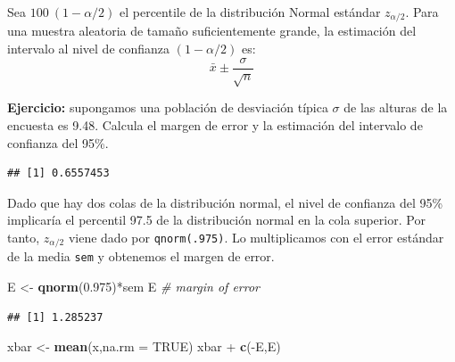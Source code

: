 \documentclass[]{article}
\newenvironment{Shaded}{\begin{snugshade}}{\end{snugshade}}
\newcommand{\KeywordTok}[1]{\textcolor[rgb]{0.13,0.29,0.53}{\textbf{{#1}}}}
\newcommand{\DataTypeTok}[1]{\textcolor[rgb]{0.13,0.29,0.53}{{#1}}}
\newcommand{\FloatTok}[1]{\textcolor[rgb]{0.00,0.00,0.81}{{#1}}}
\newcommand{\StringTok}[1]{\textcolor[rgb]{0.31,0.60,0.02}{{#1}}}
\newcommand{\CommentTok}[1]{\textcolor[rgb]{0.56,0.35,0.01}{\textit{{#1}}}}
\newcommand{\OtherTok}[1]{\textcolor[rgb]{0.56,0.35,0.01}{{#1}}}
\newcommand{\NormalTok}[1]{{#1}}
\numberwithin{equation}{section}
\begin{document}
Sea \(100~(1-\alpha/2)\) el percentile de la distribución Normal
estándar \(z_{\alpha/2}\). Para una muestra aleatoria de tamaño
suficientemente grande, la estimación del intervalo al nivel de
confianza \((1-\alpha/2)\) es: \[
  \bar{x} \pm \frac{\sigma}{\sqrt{n}}
\]

\textbf{Ejercicio:} supongamos una población de desviación típica
\(\sigma\) de las alturas de la encuesta es 9.48. Calcula el margen de
error y la estimación del intervalo de confianza del 95\%.

\begin{Shaded}
\end{Shaded}

\begin{verbatim}
## [1] 0.6557453
\end{verbatim}

Dado que hay dos colas de la distribución normal, el nivel de confianza
del 95\% implicaría el percentil 97.5 de la distribución normal en la
cola superior. Por tanto, \(z_{\alpha/2}\) viene dado por
\texttt{qnorm(.975)}. Lo multiplicamos con el error estándar de la media
\texttt{sem} y obtenemos el margen de error.

\begin{Shaded}
\begin{Highlighting}[]
\NormalTok{E <-}\StringTok{ }\KeywordTok{qnorm}\NormalTok{(}\FloatTok{0.975}\NormalTok{)*sem }
\NormalTok{E  }\CommentTok{# margin of error}
\end{Highlighting}
\end{Shaded}

\begin{verbatim}
## [1] 1.285237
\end{verbatim}

\begin{Shaded}
\begin{Highlighting}[]
\NormalTok{xbar <-}\StringTok{ }\KeywordTok{mean}\NormalTok{(x,}\DataTypeTok{na.rm =} \OtherTok{TRUE}\NormalTok{)}
\NormalTok{xbar +}\StringTok{ }\KeywordTok{c}\NormalTok{(-E,E)}
\end{Highlighting}
\end{Shaded}
\end{document}
